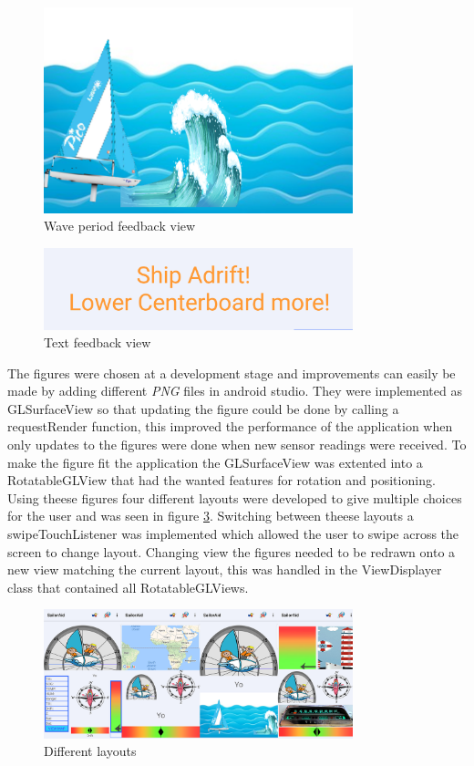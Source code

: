 \begin{figure}[H]
\centering
\includegraphics[width=0.8\textwidth]{Figures/wave.png}
\caption{Wave period feedback view}
\label{feedback-wave}
\end{figure}
\begin{figure}[H]
\centering
\includegraphics[width=0.8\textwidth]{Figures/text.png}
\caption{Text feedback view}
\label{feedback-text}
\end{figure}
The figures were chosen at a development stage and improvements can easily be made by adding different \textit{PNG}\cite{png} files in android studio. They were implemented as GLSurfaceView\cite{gl} so that updating the figure could be done by calling a requestRender function, this improved the performance of the application when only updates to the figures were done when new sensor readings were received. To make the figure fit the application the GLSurfaceView was extented into a RotatableGLView that had the wanted features for rotation and positioning. Using theese figures four different layouts were developed to give multiple choices for the user and was seen in figure \ref{feedback-layouts}. Switching between theese layouts a swipeTouchListener was implemented which allowed the user to swipe across the screen to change layout. Changing view the figures needed to be redrawn onto a new view matching the current layout, this was handled in the ViewDisplayer class that contained all RotatableGLViews.

\begin{figure}[H]
\centering
\includegraphics[width=0.8\textwidth]{Figures/layouts.png}
\caption{Different layouts}
\label{feedback-layouts}
\end{figure}

